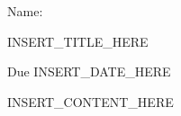 \documentclass[12pt]{article}
\begin{document}
Name: \makebox[3in]{\hrulefill
\hrulefill}

\vfill

\begin{center}
{\huge INSERT_TITLE_HERE}

{\large Due INSERT_DATE_HERE}
\end{center}

\testrules

\vfill

\pledge

\newpage

INSERT_CONTENT_HERE
\end{document}
